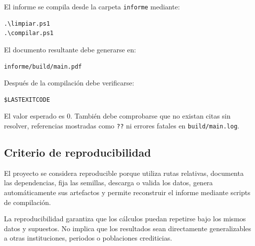 El informe se compila desde la carpeta \texttt{informe} mediante:

\begin{verbatim}
.\limpiar.ps1
.\compilar.ps1
\end{verbatim}

El documento resultante debe generarse en:

\begin{center}
    \texttt{informe/build/main.pdf}
\end{center}

Después de la compilación debe verificarse:

\begin{verbatim}
$LASTEXITCODE
\end{verbatim}

El valor esperado es \(0\). También debe comprobarse que no existan citas
sin resolver, referencias mostradas como \texttt{??} ni errores fatales en
\texttt{build/main.log}.

\subsection{Criterio de reproducibilidad}

El proyecto se considera reproducible porque utiliza rutas relativas,
documenta las dependencias, fija las semillas, descarga o valida los datos,
genera automáticamente sus artefactos y permite reconstruir el informe
mediante scripts de compilación.

La reproducibilidad garantiza que los cálculos puedan repetirse bajo los
mismos datos y supuestos. No implica que los resultados sean directamente
generalizables a otras instituciones, periodos o poblaciones crediticias.